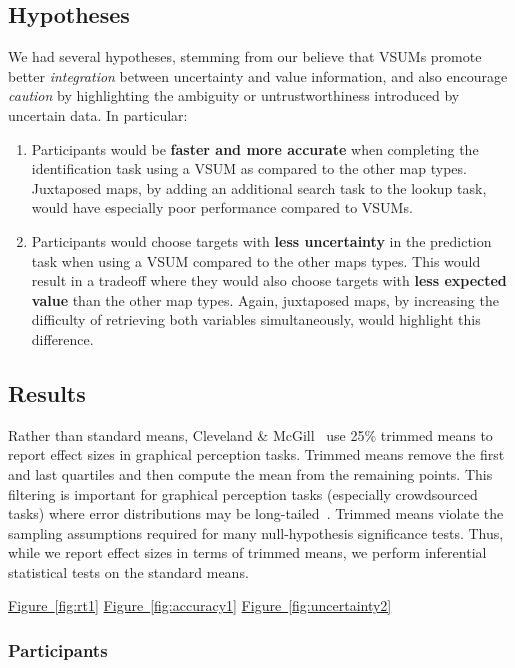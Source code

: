 \documentclass{vgtc}                          %
\newcommand{\figref}[1]{\hyperref[#1]{Figure~\ref*{#1}}}
\begin{document}
\subsection{Hypotheses}

We had several hypotheses, stemming from our believe that VSUMs promote better \emph{integration} between uncertainty and value information, and also encourage \emph{caution} by highlighting the ambiguity or untrustworthiness introduced by uncertain data. In particular:
\begin{enumerate}
	\item Participants would be \textbf{faster and more accurate} when completing the identification task using a VSUM as compared to the other map types. Juxtaposed maps, by adding an additional search task to the lookup task, would have especially poor performance compared to VSUMs.
	\item Participants would choose targets with \textbf{less uncertainty} in the prediction task when using a VSUM compared to the other maps types. This would result in a tradeoff where they would also choose targets with \textbf{less expected value} than the other map types. Again, juxtaposed maps, by increasing the difficulty of retrieving both variables simultaneously, would highlight this difference.
\end{enumerate}

\subsection{Results}

Rather than standard means, Cleveland \& McGill~\cite{cleveland1984graphical} use 25\% trimmed means to report effect sizes in graphical perception tasks. Trimmed means remove the first and last quartiles and then compute the mean from the remaining points. This filtering is important for graphical perception tasks (especially crowdsourced tasks) where error distributions may be long-tailed~\cite{heer2010crowdsourcing}. Trimmed means violate the sampling assumptions required for many null-hypothesis significance tests. Thus, while we report effect sizes in terms of trimmed means, we perform inferential statistical tests on the standard means.

\responseTimeFig
\accuracyFig
\uncertaintyFig

\figref{fig:rt1}
\figref{fig:accuracy1}
\figref{fig:uncertainty2}

\subsubsection{Participants}
\end{document}
